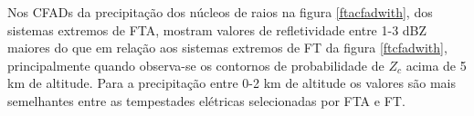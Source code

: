 



Nos CFADs da precipitação dos núcleos de raios na figura \ref{ftacfadwith}, dos sistemas extremos de FTA, mostram valores de refletividade entre 1-3 dBZ maiores do que em relação aos sistemas extremos de FT da figura \ref{ftcfadwith}, principalmente quando observa-se os contornos de probabilidade de $Z_c$ acima de 5 km de altitude. Para a precipitação entre 0-2 km de altitude os valores são mais semelhantes entre as tempestades elétricas selecionadas por FTA e FT. 


